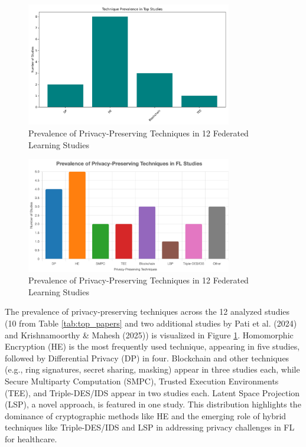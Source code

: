 \documentclass[12pt]{report}
\begin{document}
\begin{figure}[h]
    \centering
    \includegraphics[width=0.8\textwidth]{technique_prevalence.png}
    \caption{Prevalence of Privacy-Preserving Techniques in 12 Federated Learning Studies}
    \label{fig:technique_prevalence}
\end{figure}

\begin{figure}[h]
    \centering
    \includegraphics[width=0.8\textwidth]{chart.png}
    \caption{Prevalence of Privacy-Preserving Techniques in 12 Federated Learning Studies}
    \label{fig:chart}
\end{figure}

The prevalence of privacy-preserving techniques across the 12 analyzed studies (10 from Table \ref{tab:top_papers} and two additional studies by Pati et al. (2024) and Krishnamoorthy \& Mahesh (2025)) is visualized in Figure \ref{fig:technique_prevalence}. Homomorphic Encryption (HE) is the most frequently used technique, appearing in five studies, followed by Differential Privacy (DP) in four. Blockchain and other techniques (e.g., ring signatures, secret sharing, masking) appear in three studies each, while Secure Multiparty Computation (SMPC), Trusted Execution Environments (TEE), and Triple-DES/IDS appear in two studies each. Latent Space Projection (LSP), a novel approach, is featured in one study. This distribution highlights the dominance of cryptographic methods like HE and the emerging role of hybrid techniques like Triple-DES/IDS and LSP in addressing privacy challenges in FL for healthcare.
\end{document}
